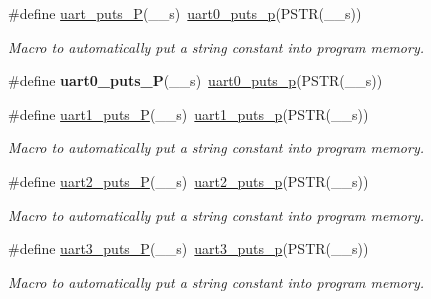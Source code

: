 \begin{DoxyCompactItemize}
\item 
\#define \hyperlink{group__avr-uart_gae9e143569df2285379bc55f9f5595bf9}{uart\-\_\-puts\-\_\-\-P}(\-\_\-\-\_\-s)~\hyperlink{group__avr-uart_gad55b367ecb822ff1c172c78af6013fe5}{uart0\-\_\-puts\-\_\-p}(P\-S\-T\-R(\-\_\-\-\_\-s))
\begin{DoxyCompactList}\small\item\em Macro to automatically put a string constant into program memory. \end{DoxyCompactList}\item 
\hypertarget{group__avr-uart_ga1335695f084ecc207e0b7ed00b5dc123}{\#define {\bfseries uart0\-\_\-puts\-\_\-\-P}(\-\_\-\-\_\-s)~\hyperlink{group__avr-uart_gad55b367ecb822ff1c172c78af6013fe5}{uart0\-\_\-puts\-\_\-p}(P\-S\-T\-R(\-\_\-\-\_\-s))}\label{group__avr-uart_ga1335695f084ecc207e0b7ed00b5dc123}

\item 
\hypertarget{group__avr-uart_gaabd7a5b0c15611ee9ecb2873cc9ee87a}{\#define \hyperlink{group__avr-uart_gaabd7a5b0c15611ee9ecb2873cc9ee87a}{uart1\-\_\-puts\-\_\-\-P}(\-\_\-\-\_\-s)~\hyperlink{group__avr-uart_ga1e8074d0a2d5922601c5db2f9777ba79}{uart1\-\_\-puts\-\_\-p}(P\-S\-T\-R(\-\_\-\-\_\-s))}\label{group__avr-uart_gaabd7a5b0c15611ee9ecb2873cc9ee87a}

\begin{DoxyCompactList}\small\item\em Macro to automatically put a string constant into program memory. \end{DoxyCompactList}\item 
\hypertarget{group__avr-uart_gab7ebcd810665b646f05aafdcfa90f852}{\#define \hyperlink{group__avr-uart_gab7ebcd810665b646f05aafdcfa90f852}{uart2\-\_\-puts\-\_\-\-P}(\-\_\-\-\_\-s)~\hyperlink{group__avr-uart_ga827c36b80bba4bee87fdda34efa327b8}{uart2\-\_\-puts\-\_\-p}(P\-S\-T\-R(\-\_\-\-\_\-s))}\label{group__avr-uart_gab7ebcd810665b646f05aafdcfa90f852}

\begin{DoxyCompactList}\small\item\em Macro to automatically put a string constant into program memory. \end{DoxyCompactList}\item 
\hypertarget{group__avr-uart_gac7e2e9902a71e9c1100117752c07030d}{\#define \hyperlink{group__avr-uart_gac7e2e9902a71e9c1100117752c07030d}{uart3\-\_\-puts\-\_\-\-P}(\-\_\-\-\_\-s)~\hyperlink{group__avr-uart_gad7d9650ed5fa2929e840aace337a3476}{uart3\-\_\-puts\-\_\-p}(P\-S\-T\-R(\-\_\-\-\_\-s))}\label{group__avr-uart_gac7e2e9902a71e9c1100117752c07030d}

\begin{DoxyCompactList}\small\item\em Macro to automatically put a string constant into program memory. \end{DoxyCompactList}\end{DoxyCompactItemize}
